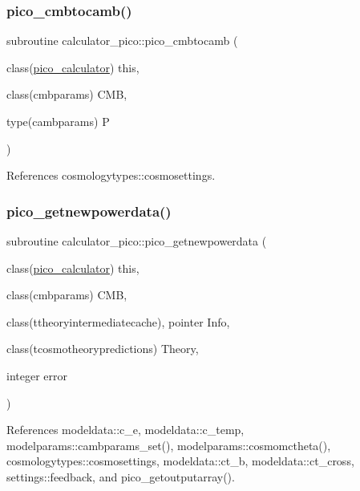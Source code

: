 \subsubsection{\texorpdfstring{pico\+\_\+cmbtocamb()}{pico\_cmbtocamb()}}
{\footnotesize\ttfamily subroutine calculator\+\_\+pico\+::pico\+\_\+cmbtocamb (\begin{DoxyParamCaption}\item[{class(\mbox{\hyperlink{structcalculator__pico_1_1pico__calculator}{pico\+\_\+calculator}})}]{this,  }\item[{class(cmbparams)}]{C\+MB,  }\item[{type(cambparams)}]{P }\end{DoxyParamCaption})\hspace{0.3cm}{\ttfamily [private]}}



References cosmologytypes\+::cosmosettings.

\mbox{\label{namespacecalculator__pico_a45cf2dcc102d6d731b105dcc2b985c04}} 
\subsubsection{\texorpdfstring{pico\+\_\+getnewpowerdata()}{pico\_getnewpowerdata()}}
{\footnotesize\ttfamily subroutine calculator\+\_\+pico\+::pico\+\_\+getnewpowerdata (\begin{DoxyParamCaption}\item[{class(\mbox{\hyperlink{structcalculator__pico_1_1pico__calculator}{pico\+\_\+calculator}})}]{this,  }\item[{class(cmbparams)}]{C\+MB,  }\item[{class(ttheoryintermediatecache), pointer}]{Info,  }\item[{class(tcosmotheorypredictions)}]{Theory,  }\item[{integer}]{error }\end{DoxyParamCaption})\hspace{0.3cm}{\ttfamily [private]}}



References modeldata\+::c\+\_\+e, modeldata\+::c\+\_\+temp, modelparams\+::cambparams\+\_\+set(), modelparams\+::cosmomctheta(), cosmologytypes\+::cosmosettings, modeldata\+::ct\+\_\+b, modeldata\+::ct\+\_\+cross, settings\+::feedback, and pico\+\_\+getoutputarray().

